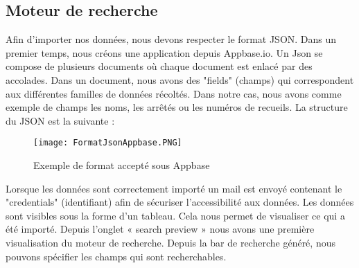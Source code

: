 

\subsection {Moteur de recherche}



Afin d'importer nos données, nous devons respecter le format JSON.
Dans un premier temps, nous créons une application depuis Appbase.io. 
Un Json se compose de plusieurs documents où chaque document est enlacé par des accolades.
Dans un document, nous avons des "fields" (champs) qui correspondent aux différentes familles de données récoltés.
Dans notre cas, nous avons comme exemple de champs les noms, les arrêtés ou les numéros de recueils. La structure du JSON est la suivante :


\begin{figure}[h!]
  \centering
	\texttt{[image: FormatJsonAppbase.PNG]}
	\caption[]{Exemple de format accepté sous Appbase}
  \label{}
\end{figure}

Lorsque les données sont correctement importé un mail est envoyé contenant le "credentials" (identifiant) afin de sécuriser l'accessibilité aux données. 
Les données sont visibles sous la forme d'un tableau. Cela nous permet de visualiser ce qui a été importé. 
Depuis l'onglet « search preview » nous avons une première visualisation du moteur de recherche. Depuis la bar de recherche généré, nous pouvons spécifier les champs qui sont recherchables.

